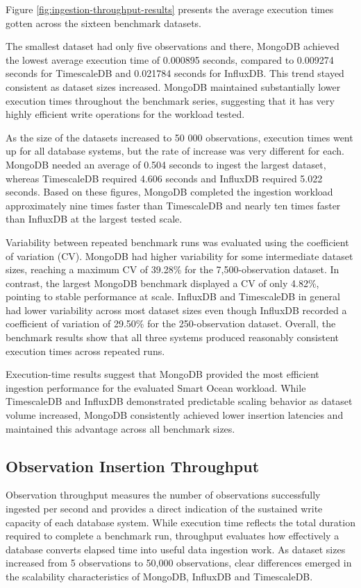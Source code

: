 Figure \ref{fig:ingestion-throughput-results} presents the average execution times gotten across the sixteen benchmark datasets. 

The smallest dataset had only five observations and there, MongoDB achieved the lowest average execution time of 0.000895 seconds, compared to 0.009274 seconds for TimescaleDB and 0.021784 seconds for InfluxDB. This trend stayed consistent as dataset sizes increased. MongoDB maintained substantially lower execution times throughout the benchmark series, suggesting that it has very highly efficient write operations for the workload tested. 

As the size of the datasets increased to 50 000 observations, execution times went up for all database systems, but the rate of increase was very different for each. MongoDB needed an average of 0.504 seconds to ingest the largest dataset, whereas TimescaleDB required 4.606 seconds and InfluxDB required 5.022 seconds. Based on these figures, MongoDB completed the ingestion workload approximately nine times faster than TimescaleDB and nearly ten times faster than InfluxDB at the largest tested scale.


Variability between repeated benchmark runs was evaluated using the coefficient of variation (CV). MongoDB had higher variability for some intermediate dataset sizes, reaching a maximum CV of 39.28\% for the 7,500-observation dataset. In contrast, the largest MongoDB benchmark displayed a CV of only 4.82\%, pointing to stable performance at scale. InfluxDB and TimescaleDB in general had lower variability across most dataset sizes even though InfluxDB recorded a coefficient of variation of 29.50\% for the 250-observation dataset. Overall, the benchmark results show that all three systems produced reasonably consistent execution times across repeated runs.


Execution-time results suggest that MongoDB provided the most efficient ingestion performance for the evaluated Smart Ocean workload. While TimescaleDB and InfluxDB demonstrated predictable scaling behavior as dataset volume increased, MongoDB consistently achieved lower insertion latencies and maintained this advantage across all benchmark sizes.



\subsection{Observation Insertion Throughput }
Observation throughput measures the number of observations successfully ingested per second and provides a direct indication of the sustained write capacity of each database system. While execution time reflects the total duration required to complete a benchmark run, throughput evaluates how effectively a database converts elapsed time into useful data ingestion work. As dataset sizes increased from 5 observations to 50,000 observations, clear differences emerged in the scalability characteristics of MongoDB, InfluxDB and TimescaleDB.

